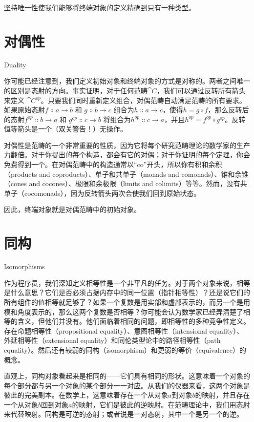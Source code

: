 坚持唯一性使我们能够将终端对象的定义精确到只有一种类型。

\section{对偶性}{Duality}

你可能已经注意到，我们定义初始对象和终端对象的方式是对称的。两者之间唯一的区别是态射的方向。事实证明，对于任何范畴$\cat{C}$，我们可以通过反转所有箭头来定义 $\cat{C}^\mathit{op}$。只要我们同时重新定义组合，对偶范畴自动满足范畴的所有要求。如果原始态射$f \Colon a \to b$ 和 $g \Colon b \to c$ 组合为$h \Colon a \to c$，使得$h = g \circ f$，那么反转后的态射$f^\mathit{op} \Colon b \to a$ 和 $g^\mathit{op} \Colon c \to b$ 将组合为$h^\mathit{op} \Colon c \to a$，并且$h^\mathit{op} = f^\mathit{op} \circ g^\mathit{op}$。反转恒等箭头是一个（双关警告！）无操作。

对偶性是范畴的一个非常重要的性质，因为它将每个研究范畴理论的数学家的生产力翻倍。对于你提出的每个构造，都会有它的对偶；对于你证明的每个定理，你会免费得到一个。在对偶范畴中的构造通常以“co”开头，所以你有积和余积（products and coproducts）、单子和共单子（monads and comonads）、锥和余锥（cones and cocones）、极限和余极限（limits and colimits）等等。然而，没有共单子（cocomonads），因为反转箭头两次会使我们回到原始状态。

因此，终端对象就是对偶范畴中的初始对象。

\section{同构}{Isomorphisms}

作为程序员，我们深知定义相等性是一个非平凡的任务。对于两个对象来说，相等是什么意思？它们是否必须占据内存中的同一位置（指针相等性）？还是说它们的所有组件的值相等就足够了？如果一个复数是用实部和虚部表示的，而另一个是用模和角度表示的，那么这两个复数是否相等？你可能会认为数学家已经弄清楚了相等的含义，但他们并没有。他们面临着相同的问题，即相等性的多种竞争性定义。存在命题相等性（propositional equality）、意图相等性（intensional equality）、外延相等性（extensional equality）和同伦类型论中的路径相等性（path equality）。然后还有较弱的同构（isomorphism）和更弱的等价（equivalence）的概念。

直观上，同构对象看起来是相同的——它们具有相同的形状。这意味着一个对象的每个部分都与另一个对象的某个部分一一对应。从我们的仪器来看，这两个对象是彼此的完美副本。在数学上，这意味着存在一个从对象$a$到对象$b$的映射，并且存在一个从对象$b$回到对象$a$的映射，它们是彼此的逆映射。在范畴理论中，我们用态射来代替映射。同构是可逆的态射；或者说是一对态射，其中一个是另一个的逆。

